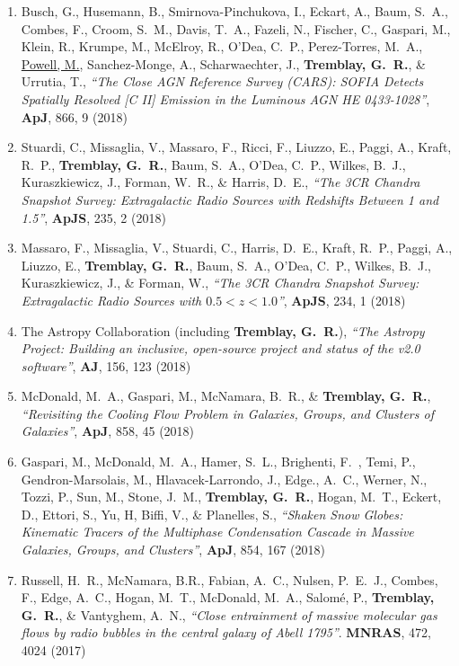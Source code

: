 \documentclass[11pt]{article}
\begin{document}
\begin{enumerate}[resume]
\item Busch, G., Husemann, B., Smirnova-Pinchukova, I., Eckart, A.,
Baum, S.~A., Combes, F., Croom, S.~M., Davis, T.~A., Fazeli, N., Fischer, C.,
Gaspari, M., Klein, R., Krumpe, M., McElroy, R., O'Dea, C.~P., Perez-Torres, M.~A.,
\uline{Powell, M.}, Sanchez-Monge, A., Scharwaechter, J., \textbf{Tremblay, G.~R.},
\& Urrutia, T., \textit{``The Close AGN Reference Survey (CARS): SOFIA Detects
Spatially Resolved [C II] Emission in the Luminous AGN HE 0433-1028''}, \textbf{ApJ},
866, 9 (2018)


\item Stuardi, C., Missaglia, V., Massaro, F., Ricci, F., Liuzzo, E.,
Paggi, A., Kraft, R.~P., \textbf{Tremblay, G.~R.}, Baum, S.~A.,
O'Dea, C.~P., Wilkes, B.~J., Kuraszkiewicz, J., Forman, W.~R., \& Harris, D.~E.,
\textit{``The 3CR Chandra Snapshot Survey: Extragalactic Radio Sources
with Redshifts Between 1 and 1.5''}, \textbf{ApJS}, 235, 2 (2018)


\item Massaro, F., Missaglia, V., Stuardi, C., Harris, D.~E.,
Kraft, R.~P., Paggi, A., Liuzzo, E., \textbf{Tremblay, G.~R.},
Baum, S.~A., O'Dea, C.~P., Wilkes, B.~J., Kuraszkiewicz, J., \& Forman, W., \textit{``The 3CR Chandra Snapshot Survey:
Extragalactic Radio Sources with $0.5 < z < 1.0$''}, \textbf{ApJS}, 234, 1 (2018)


\item The Astropy Collaboration (including \textbf{Tremblay, G.~R.}), \textit{``The Astropy Project: Building an inclusive,
open-source project and status of the v2.0 software''}, \textbf{AJ}, 156, 123 (2018)


\item McDonald, M.~A., Gaspari, M., McNamara, B.~R., \& \textbf{Tremblay, G.~R.}, \textit{``Revisiting the Cooling Flow Problem in Galaxies, Groups, and Clusters of Galaxies''}, \textbf{ApJ}, 858, 45 (2018)


\item Gaspari, M., McDonald, M.~A.,
Hamer, S.~L., Brighenti, F.~, Temi, P., Gendron-Marsolais, M., Hlavacek-Larrondo, J., Edge., A.~C.,
Werner, N., Tozzi, P., Sun, M.,
Stone, J.~M., \textbf{Tremblay, G.~R.}, Hogan, M.~T., Eckert, D.,
Ettori, S., Yu, H, Biffi, V.,
\& Planelles, S., \textit{``Shaken Snow Globes: Kinematic Tracers of the Multiphase Condensation
 Cascade in Massive Galaxies, Groups, and Clusters''}, \textbf{ApJ}, 854, 167 (2018)

\item Russell, H.~R., McNamara, B.R., Fabian, A.~C., Nulsen, P.~E.~J., Combes, F., Edge, A.~C., Hogan, M.~T., McDonald, M.~A., Salom\'{e}, P.,
\textbf{Tremblay, G.~R.}, \& Vantyghem, A.~N., \textit{``Close entrainment of massive molecular gas flows by radio bubbles in the central galaxy of Abell 1795''}. \textbf{MNRAS}, 472, 4024 (2017)



\end{enumerate}
\end{document}
